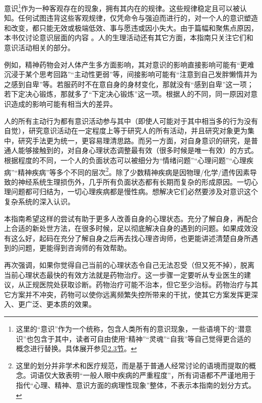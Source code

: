 意识\footnote{这里的“意识”作为一个统称，包含人类所有的意识现象，一些语境下的“潜意识”也包含于其中，读者可自由使用“精神”“灵魂”“自我”等自己觉得更合适的概念进行替换。具体展开参见\hyperref[sec:意识与自我]{2.3节}。}作为一种客观存在的现象，拥有其内在的规律。这些规律稳定且可以被认知。任何试图违背这些客观规律，仅凭命令与强迫而进行的，对一个人的意识塑造和改变，都只能无效或极端低效、事与愿违或因小失大。由于篇幅和聚焦点原因，本书仅讨论意识层面的内容%
。人的生理活动还有其它方面，本指南只关注它们和意识活动相关的部分。
\begin{examples}
    例如，精神药物会对人体产生多方面影响，其对意识的影响直接影响可能有“更难沉浸于某个思考回路”“主动性更弱”等，间接影响可能有“注意到自己发胖懒惰并为之感到自卑”等。若服药时不在意自身的身材变化，那就没有“感到自卑”这一项；若下定决心锻炼，那就多了“下定决心锻炼”这一项。根据人的不同，同一原因对意识造成的影响可能有相当大的差异。
\end{examples}
人的所有主动行为都有意识活动参与其中（即使人可能对于其中相当多的行为没有自觉），研究意识活动在一定程度上等于研究人的所有活动，并且研究对象更为集中，研究手法更为统一，更容易理清思路。而另一方面，对自身意识的研究，是普通人能够接触到的，对自身心理状态调整最有效（很多时候是唯一有效）的方式。根据程度的不同，一个人的负面状态可以被细分为“情绪问题”“心理问题”“心理疾病”“精神疾病”等多个不同的层次\footnote{这里的划分并非学术和医疗规范，而是基于普通人经常讨论的语境而提取的概念。词语仅大致表明“一般人眼中疾病的严重程度”，所有词语都不严谨地用于指代“心理、精神、意识方面的病理性现象”整体，不表示本指南的划分方式。}。除了少数精神疾病是因物理/化学/遗传因素导致的神经系统生理损伤外，几乎所有负面状态都有长期而复杂的形成原因。一切心理问题都可归结为，一切心理疾病都是慢性病。想解决它们必然要涉及对意识这个复杂系统的深入认识。

本指南希望这样的尝试有助于更多人改善自身的心理状态。充分了解自身，再配合上合适的新处世方法，在很多时候，足以彻底解决自身的遇到的问题。如果成效没有这么好，起码在充分了解自身之后再去找心理咨询师，也更能讲述清楚自身所遇到的问题，更能得到咨询师的有效帮助。

再次强调，如果你觉得自己当前的心理状态令自己无法忍受（但又死不掉），脱离当前心理状态最快的有效方法就是药物治疗。这一步骤一定要听从专业医生的建议，从正规医院处获取诊断。药物治疗可能不治本，但它至少治标。药物治疗与其它方案并不冲突，药物可以使你远离频繁失控所带来的干扰，使其它方案发挥更深入、更广泛、更本质的效果。
